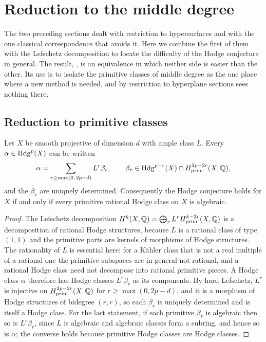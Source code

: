 \section{Reduction to the middle degree}\label{sec:reduction}

The two preceding sections dealt with restriction to hypersurfaces and with
the one classical correspondence that avoids it. Here we combine the first of
them with the Lefschetz decomposition to locate the difficulty of the Hodge
conjecture in general. The result, , is an equivalence
in which neither side is easier than the other. Its use is to isolate the
primitive classes of middle degree as the one place where a new method is
needed, and by  restriction to hyperplane sections sees
nothing there.

\subsection{Reduction to primitive classes}

\begin{proposition}%
\label{prop:lefschetzdecomp}
Let $X$ be smooth projective of dimension $d$ with ample class $L$. Every
$\alpha\in\mathrm{Hdg}^{p}(X)$ can be written
\[
  \alpha=\sum_{r\ge\max(0,\,2p-d)}L^{r}\beta_{r},
  \qquad
  \beta_{r}\in\mathrm{Hdg}^{p-r}(X)\cap H^{2p-2r}_{\mathrm{prim}}(X,\mathbb{Q}),
\]
and the $\beta_{r}$ are uniquely determined. Consequently the Hodge conjecture
holds for $X$ if and only if every primitive rational Hodge class on $X$ is
algebraic.
\end{proposition}

\begin{proof}
The Lefschetz decomposition
$H^{k}(X,\mathbb{Q})=\bigoplus_{r}L^{r}H^{k-2r}_{\mathrm{prim}}(X,\mathbb{Q})$ is a
decomposition of rational Hodge structures, because $L$ is a rational class
of type $(1,1)$ and the primitive parts are kernels of morphisms of Hodge
structures. The rationality of $L$ is essential here: for a K\"ahler class
that is not a real multiple of a rational one the primitive subspaces are in
general not rational, and a rational Hodge class need not decompose into
rational primitive pieces. A Hodge class $\alpha$ therefore has Hodge classes
$L^{r}\beta_{r}$ as its components. By hard Lefschetz, $L^{r}$ is injective
on $H^{2p-2r}_{\mathrm{prim}}(X,\mathbb{Q})$ for $r\ge\max(0,2p-d)$, and it is a
morphism of Hodge structures of bidegree $(r,r)$, so each $\beta_{r}$ is
uniquely determined and is itself a Hodge class. For the last statement, if
each primitive $\beta_{r}$ is algebraic then so is $L^{r}\beta_{r}$, since $L$
is algebraic and algebraic classes form a subring, and hence so is $\alpha$;
the converse holds because primitive Hodge classes are Hodge classes.
\end{proof}

